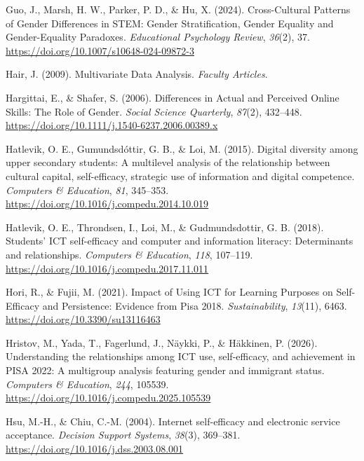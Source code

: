 \documentclass[
  letterpaper,
  DIV=11,
  numbers=noendperiod]{scrartcl}
\newlength{\cslhangindent}
\newenvironment{CSLReferences}[2] %
 {\begin{list}{}{%
  \setlength{\itemindent}{0pt}
  \setlength{\leftmargin}{0pt}
  \setlength{\parsep}{0pt}
  \ifodd #1
   \setlength{\leftmargin}{\cslhangindent}
   \setlength{\itemindent}{-1\cslhangindent}
  \fi
  \setlength{\itemsep}{#2\baselineskip}}}
 {\end{list}}
\begin{document}
\begin{CSLReferences}{1}{0}
Guo, J., Marsh, H. W., Parker, P. D., \& Hu, X. (2024). Cross-{Cultural
Patterns} of {Gender Differences} in {STEM}: {Gender Stratification},
{Gender Equality} and {Gender-Equality Paradoxes}. \emph{Educational
Psychology Review}, \emph{36}(2), 37.
\url{https://doi.org/10.1007/s10648-024-09872-3}

Hair, J. (2009). Multivariate {Data Analysis}. \emph{Faculty Articles}.

Hargittai, E., \& Shafer, S. (2006). Differences in {Actual} and
{Perceived Online Skills}: {The Role} of {Gender}. \emph{Social Science
Quarterly}, \emph{87}(2), 432--448.
\url{https://doi.org/10.1111/j.1540-6237.2006.00389.x}

Hatlevik, O. E., Gumundsdóttir, G. B., \& Loi, M. (2015). Digital
diversity among upper secondary students: {A} multilevel analysis of the
relationship between cultural capital, self-efficacy, strategic use of
information and digital competence. \emph{Computers \& Education},
\emph{81}, 345--353. \url{https://doi.org/10.1016/j.compedu.2014.10.019}

Hatlevik, O. E., Throndsen, I., Loi, M., \& Gudmundsdottir, G. B.
(2018). Students' {ICT} self-efficacy and computer and information
literacy: {Determinants} and relationships. \emph{Computers \&
Education}, \emph{118}, 107--119.
\url{https://doi.org/10.1016/j.compedu.2017.11.011}

Hori, R., \& Fujii, M. (2021). Impact of {Using ICT} for {Learning
Purposes} on {Self-Efficacy} and {Persistence}: {Evidence} from {Pisa}
2018. \emph{Sustainability}, \emph{13}(11), 6463.
\url{https://doi.org/10.3390/su13116463}

Hristov, M., Yada, T., Fagerlund, J., Näykki, P., \& Häkkinen, P.
(2026). Understanding the relationships among {ICT} use, self-efficacy,
and achievement in {PISA} 2022: {A} multigroup analysis featuring gender
and immigrant status. \emph{Computers \& Education}, \emph{244}, 105539.
\url{https://doi.org/10.1016/j.compedu.2025.105539}

Hsu, M.-H., \& Chiu, C.-M. (2004). Internet self-efficacy and electronic
service acceptance. \emph{Decision Support Systems}, \emph{38}(3),
369--381. \url{https://doi.org/10.1016/j.dss.2003.08.001}


\end{CSLReferences}
\end{document}
